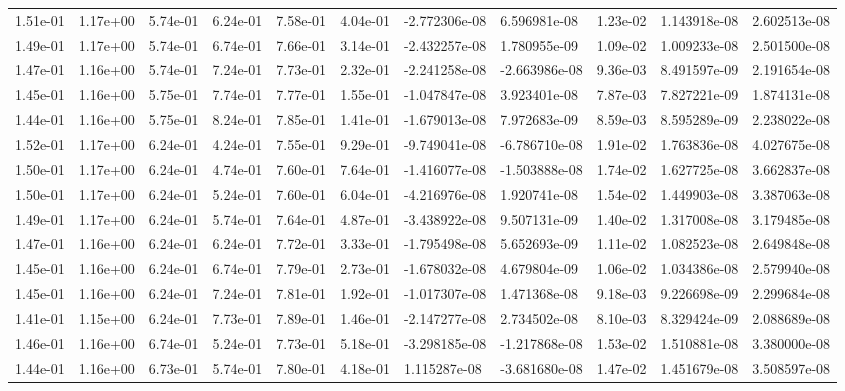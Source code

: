 \begin{longtable}{| p{} | p{} |}
1.51e-01 & 1.17e+00 & 5.74e-01 & 6.24e-01 & 7.58e-01 & 4.04e-01 & -2.772306e-08 &  6.596981e-08 &  1.23e-02 &  1.143918e-08 &  2.602513e-08 \\
1.49e-01 & 1.17e+00 & 5.74e-01 & 6.74e-01 & 7.66e-01 & 3.14e-01 & -2.432257e-08 &  1.780955e-09 &  1.09e-02 &  1.009233e-08 &  2.501500e-08 \\
1.47e-01 & 1.16e+00 & 5.74e-01 & 7.24e-01 & 7.73e-01 & 2.32e-01 & -2.241258e-08 & -2.663986e-08 &  9.36e-03 &  8.491597e-09 &  2.191654e-08 \\
1.45e-01 & 1.16e+00 & 5.75e-01 & 7.74e-01 & 7.77e-01 & 1.55e-01 & -1.047847e-08 &  3.923401e-08 &  7.87e-03 &  7.827221e-09 &  1.874131e-08 \\
1.44e-01 & 1.16e+00 & 5.75e-01 & 8.24e-01 & 7.85e-01 & 1.41e-01 & -1.679013e-08 &  7.972683e-09 &  8.59e-03 &  8.595289e-09 &  2.238022e-08 \\
1.52e-01 & 1.17e+00 & 6.24e-01 & 4.24e-01 & 7.55e-01 & 9.29e-01 & -9.749041e-08 & -6.786710e-08 &  1.91e-02 &  1.763836e-08 &  4.027675e-08 \\
1.50e-01 & 1.17e+00 & 6.24e-01 & 4.74e-01 & 7.60e-01 & 7.64e-01 & -1.416077e-08 & -1.503888e-08 &  1.74e-02 &  1.627725e-08 &  3.662837e-08 \\
1.50e-01 & 1.17e+00 & 6.24e-01 & 5.24e-01 & 7.60e-01 & 6.04e-01 & -4.216976e-08 &  1.920741e-08 &  1.54e-02 &  1.449903e-08 &  3.387063e-08 \\
1.49e-01 & 1.17e+00 & 6.24e-01 & 5.74e-01 & 7.64e-01 & 4.87e-01 & -3.438922e-08 &  9.507131e-09 &  1.40e-02 &  1.317008e-08 &  3.179485e-08 \\
1.47e-01 & 1.16e+00 & 6.24e-01 & 6.24e-01 & 7.72e-01 & 3.33e-01 & -1.795498e-08 &  5.652693e-09 &  1.11e-02 &  1.082523e-08 &  2.649848e-08 \\
1.45e-01 & 1.16e+00 & 6.24e-01 & 6.74e-01 & 7.79e-01 & 2.73e-01 & -1.678032e-08 &  4.679804e-09 &  1.06e-02 &  1.034386e-08 &  2.579940e-08 \\
1.45e-01 & 1.16e+00 & 6.24e-01 & 7.24e-01 & 7.81e-01 & 1.92e-01 & -1.017307e-08 &  1.471368e-08 &  9.18e-03 &  9.226698e-09 &  2.299684e-08 \\
1.41e-01 & 1.15e+00 & 6.24e-01 & 7.73e-01 & 7.89e-01 & 1.46e-01 & -2.147277e-08 &  2.734502e-08 &  8.10e-03 &  8.329424e-09 &  2.088689e-08 \\
1.46e-01 & 1.16e+00 & 6.74e-01 & 5.24e-01 & 7.73e-01 & 5.18e-01 & -3.298185e-08 & -1.217868e-08 &  1.53e-02 &  1.510881e-08 &  3.380000e-08 \\
1.44e-01 & 1.16e+00 & 6.73e-01 & 5.74e-01 & 7.80e-01 & 4.18e-01 &  1.115287e-08 & -3.681680e-08 &  1.47e-02 &  1.451679e-08 &  3.508597e-08 \\

\end{longtable}
